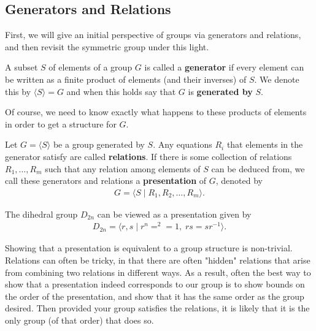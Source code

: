 \documentclass{memoir}
\begin{document}


\subsection{Generators and Relations}
\label{sec:generators_and_relations}

First, we will give an initial perspective of groups via generators and relations, and then revisit the symmetric group under this light.
\begin{defn}[Generator]
	A subset \(S\) of elements of a group \(G\) is called a \textbf{generator} if every element can be written as a finite product of elements (and their inverses) of \(S\). We denote this by \(\langle S \rangle =G\) and when this holds say that \(G\) is \textbf{generated by} \(S\).
\end{defn}
Of course, we need to know exactly what happens to these products of elements in order to get a structure for \(G\).

\begin{defn}
	Let \(G = \langle S \rangle \) be a group generated by \(S\). Any equations \(R_i\) that elements in the generator satisfy are called \textbf{relations}. If there is some collection of relations \(R_1,\ldots,R_m\) such that any relation among elements of \(S\) can be deduced from, we call these generators and relations a \textbf{presentation} of \(G\), denoted by
	\begin{align*}
		G = \langle S \mid R_1,R_2,\ldots,R_m \rangle .
	\end{align*}
\end{defn}

\begin{exmp}
	The dihedral group \(D_{2n}\) can be viewed as a presentation given by
	\begin{align*}
		D_{2n} = \langle r,s \mid r^{n}=^2=1, \; rs = sr^{-1} \rangle .
	\end{align*}
\end{exmp}
Showing that a presentation is equivalent to a group structure is non-trivial. Relations can often be tricky, in that there are often "hidden" relations that arise from combining two relations in different ways. As a result, often the best way to show that a presentation indeed corresponds to our group is to show bounds on the order of the presentation, and show that it has the same order as the group desired. Then provided your group satisfies the relations, it is likely that it is the only group (of that order) that does so.



\end{document}
